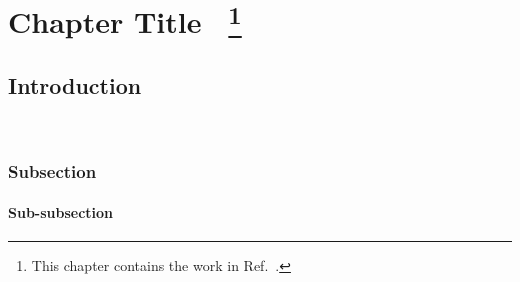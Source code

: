 \chapter[Chapter Title]
{Chapter Title ~\footnote{This chapter contains the work in Ref.~\cite{abc1}.}}
\label{chap:2}

\section{Introduction}
\lipsum[2-4]  ~\cite{abc1}
\subsection{Subsection}
\lipsum[2-4]
\subsubsection{Sub-subsection}
\lipsum[2-4]







